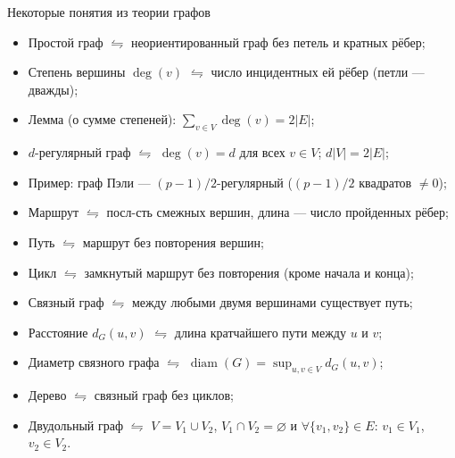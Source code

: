 \documentclass[serif, aspectratio=169]{beamer}
\begin{document}
\begin{frame}{Некоторые понятия из теории графов}
    \begin{itemize}
        \item Простой граф $\leftrightharpoons$ неориентированный граф без петель и кратных рёбер;
        \item Степень вершины $\deg(v)$ $\leftrightharpoons$ число инцидентных ей рёбер (петли --- дважды);
        \item Лемма (о сумме степеней): $\sum_{v\in V}\deg(v)=2|E|$;
        \item $d$-регулярный граф $\leftrightharpoons$ $\deg(v)=d$ для всех $v\in V$; $d|V|=2|E|$;
        \item Пример: граф Пэли --- $(p-1)/2$-регулярный ($(p-1)/2$ квадратов $\neq 0$);
        \item Маршрут $\leftrightharpoons$ посл-сть смежных вершин, длина --- число пройденных рёбер;
        \item Путь $\leftrightharpoons$ маршрут без повторения вершин;
        \item Цикл $\leftrightharpoons$ замкнутый маршрут без повторения (кроме начала и конца);
        \item Связный граф $\leftrightharpoons$ между любыми двумя вершинами существует путь;
        \item Расстояние $d_G(u,v)$ $\leftrightharpoons$ длина кратчайшего пути между $u$ и $v$;
        \item Диаметр связного графа $\leftrightharpoons$ $\operatorname{diam}(G)=\sup_{u,v\in V}d_G(u,v)$;
        \item Дерево $\leftrightharpoons$ связный граф без циклов;
        \item Двудольный граф $\leftrightharpoons$ $V=V_1\cup V_2$, $V_1\cap V_2=\varnothing$ и $\forall \{v_1,v_2\}\in E$: $v_1\in V_1$, $v_2\in V_2$.
    \end{itemize}
    \note{
        \begin{itemize}
            \item ---
        \end{itemize}
    }
\end{frame}
\end{document}
